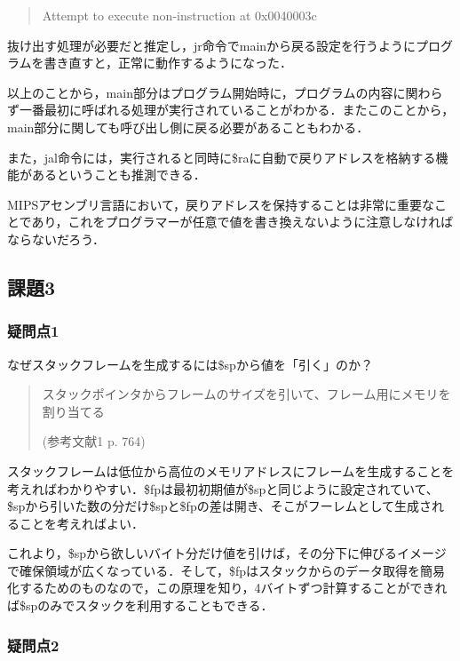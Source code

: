 \documentclass[a4j]{jarticle}
\begin{document}
\begin{quote}
Attempt to execute non-instruction at 0x0040003c
\end{quote}

抜け出す処理が必要だと推定し，jr命令でmainから戻る設定を行うようにプログラムを書き直すと，正常に動作するようになった．

以上のことから，main部分はプログラム開始時に，プログラムの内容に関わらず一番最初に呼ばれる処理が実行されていることがわかる．またこのことから，main部分に関しても呼び出し側に戻る必要があることもわかる．

また，jal命令には，実行されると同時に\$raに自動で戻りアドレスを格納する機能があるということも推測できる．

MIPSアセンブリ言語において，戻りアドレスを保持することは非常に重要なことであり，これをプログラマーが任意で値を書き換えないように注意しなければならないだろう．




\subsection{課題3}

\subsubsection{疑問点1}

なぜスタックフレームを生成するには\$spから値を「引く」のか？

\begin{quote}
スタックポインタからフレームのサイズを引いて、フレーム用にメモリを割り当てる 

(参考文献1 p. 764)
\end{quote}

スタックフレームは低位から高位のメモリアドレスにフレームを生成することを考えればわかりやすい．\$fpは最初初期値が\$spと同じように設定されていて、\$spから引いた数の分だけ\$spと\$fpの差は開き、そこがフーレムとして生成されることを考えればよい．

これより，\$spから欲しいバイト分だけ値を引けば，その分下に伸びるイメージで確保領域が広くなっている．そして，\$fpはスタックからのデータ取得を簡易化するためのものなので，この原理を知り，4バイトずつ計算することができれば\$spのみでスタックを利用することもできる．

\subsubsection{疑問点2}
\end{document}
